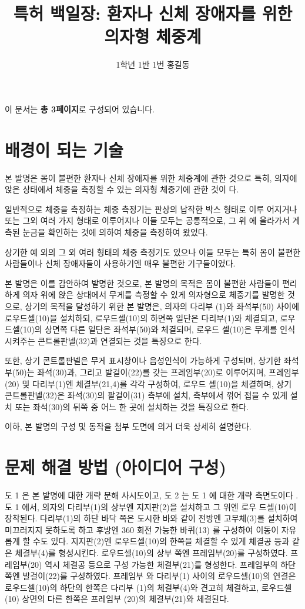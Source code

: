 \documentclass{oblivoir}
\title{특허 백일장: 환자나 신체 장애자를 위한 의자형 체중계}
\author{1학년 1반 1번 홍길동}
\begin{document}
	\maketitle
	\tableofcontents
	
	이 문서는 \textbf{총 3페이지}로 구성되어 있습니다.
	\section{배경이 되는 기술}
	본 발명은 몸이 불편한 환자나 신체 장애자를 위한 체중계에 관한 것으로 특히, 의자에 앉은 상태에서 체중을 측정할 수 있는 의자형 체중기에 관한 것이 다.
	
	일반적으로 체중을 측정하는 체중 측정기는 판상의 납작한 박스 형태로 이루 어지거나 또는 그외 여러 가지 형태로 이루어지나 이들 모두는 공통적으로, 그 위 에 올라가서 계측된 눈금을 확인하는 것에 의하여 체중을 측정하여 왔었다.
	
	상기한 예 외의 그 외 여러 형태의 체중 측정기도 있으나 이들 모두는 특히 몸이 불편한 사람들이나 신체 장애자들이 사용하기엔 매우 불편한 기구들이었다.
	
	본 발명은 이를 감안하여 발명한 것으로, 본 발명의 목적은 몸이 불편한 사람들이 편리하게 의자 위에 앉은 상태에서 무게를 측정할 수 있게 의자형으로 체중기를 발명한 것으로, 상기의 목적을 달성하기 위한 본 발명은, 의자의 다리부 (1)와 좌석부(50) 사이에 로우드셀(10)을 설치하되, 로우드셀(10)의 하면쪽 일단은 다리부(1)와 체결되고, 로우드셀(10)의 상면쪽 다른 일단은 좌석부(50)와 체결되며, 로우드 셀(10)은 무게를 인식시켜주는 콘트롤판넬(32)과 연결되는 것을 특징으로 한다.
	
	또한, 상기 콘트롤판넬은 무게 표시창이나 음성인식이 가능하게 구성되며, 상기한 좌석부(50)는 좌석(30)과, 그리고 발걸이(22)를 갖는 프레임부(20)로 이루어지며, 프레임부(20) 및 다리부(1)엔 체결부(21,4)를 각각 구성하여, 로우드 셀(10)을 체결하며, 상기 콘트롤판넬(32)은 좌석(30)의 팔걸이(31) 측부에 설치, 측부에서 꺾어 접을 수 있게 설치 또는 좌석(30)의 뒤쪽 중 어느 한 곳에 설치하는 것을 특징으로 한다.
	
	이하, 본 발명의 구성 및 동작을 첨부 도면에 의거 더욱 상세히 설명한다.
	
	\section{문제 해결 방법 (아이디어 구성)}
	도 1 은 본 발명에 대한 개략 분해 사시도이고, 도 2 는 도 1 에 대한 개략 측면도이다 .
	도 1 에서, 의자의 다리부(1)의 상부엔 지지판(2)을 설치하고 그 위엔 로우 드셀(10)이 장착된다. 다리부(1)의 하단 바닥 쪽은 도시한 바와 같이 전방엔 고무체(3)를 설치하여 미끄러지지 못하도록 하고 후방엔 360 회전 가능한 바퀴(13) 를 구성하여 이동이 자유롭게 할 수도 있다.
	지지판(2)엔 로우드셀(10)의 한쪽을 체결할 수 있게 체결공 등과 같은 체결부(4)를 형성시킨다.
	로우드셀(10)의 상부 쪽엔 프레임부(20)를 구성하였다. 
	프레임부(20) 역시 체결공 등으로 구성 가능한 체결부(21)를 형성한다.
	프레임부의 하단쪽엔 발걸이(22)를 구성하였다. 
	프레임부 와 다리부(1) 사이의 로우드셀(10)의 연결은 로우드셀(10)의 하단의 한쪽은 다리부 (1)의 체결부(4)와 견고히 체결하고, 로우드셀(10) 상면의 다른 한쪽은 프레임부 (20)의 체결부(21)와 체결된다.
	
\end{document}
